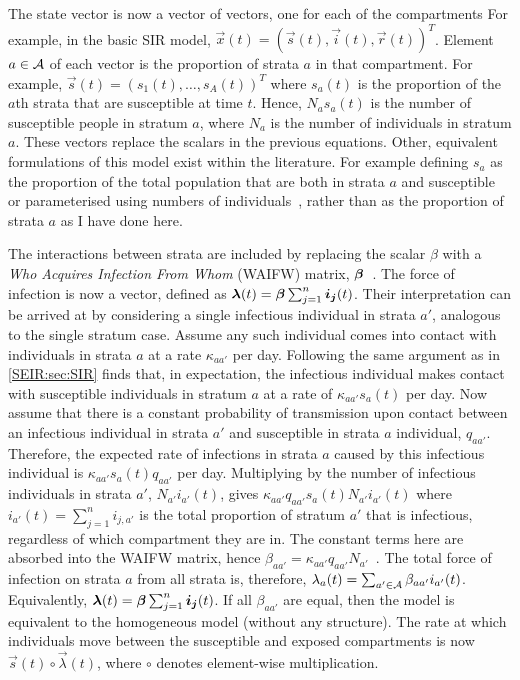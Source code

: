 \documentclass[thesis.tex]{subfiles}
\begin{document}
The state vector is now a vector of vectors, one for each of the compartments
For example, in the basic SIR model, $\vec{x}(t) = (\vec{s}(t), \vec{i}(t), \vec{r}(t))^T$.
Element $a \in \mathcal{A}$ of each vector is the proportion of strata $a$ in that compartment.
For example, $\vec{s}(t) = (s_1(t), \dots, s_A(t))^T$ where $s_a(t)$ is the proportion of the $a$th strata that are susceptible at time $t$.
Hence, $N_a s_a(t)$ is the number of susceptible people in stratum $a$, where $N_a$ is the number of individuals in stratum $a$.
These vectors replace the scalars in the previous equations.
Other, equivalent formulations of this model exist within the literature.
For example defining $s_a$ as the proportion of the total population that are both in strata $a$ and susceptible or parameterised using numbers of individuals~\autocite[57]{keelingModeling}, rather than as the proportion of strata $a$ as I have done here.

The interactions between strata are included by replacing the scalar $\beta$ with a \emph{Who Acquires Infection From Whom} (WAIFW) matrix, $\bm{\beta}$~\autocite[58]{keelingModeling}.
The force of infection is now a vector, defined as $\bm\lambda(t) = \bm{\beta} \sum_{j=1}^n \bm{i_j}(t)$.
Their interpretation can be arrived at by considering a single infectious individual in strata $a'$, analogous to the single stratum case.
Assume any such individual comes into contact with individuals in strata $a$ at a rate $\kappa_{aa'}$ per day.
Following the same argument as in \cref{SEIR:sec:SIR} finds that, in expectation, the infectious individual makes contact with susceptible individuals in stratum $a$ at a rate of $\kappa_{aa'} s_a(t)$ per day.
Now assume that there is a constant probability of transmission upon contact between an infectious individual in strata $a'$ and susceptible in strata $a$ individual, $q_{aa'}$.
Therefore, the expected rate of infections in strata $a$ caused by this infectious individual is $\kappa_{aa'} s_a(t) q_{aa'}$ per day.
Multiplying by the number of infectious individuals in strata $a'$, $N_{a'} i_{a'}(t)$, gives $\kappa_{aa'} q_{aa'} s_a(t) N_{a'} i_{a'}(t)$ where $i_{a'}(t) = \sum_{j=1}^n i_{j,a'}$ is the total proportion of stratum $a'$ that is infectious, regardless of which compartment they are in.
The constant terms here are absorbed into the WAIFW matrix, hence $\beta_{aa'} = \kappa_{aa'} q_{aa'} N_{a'}$~\autocite[section 9.2]{diekmannMathematical}.
The total force of infection on strata $a$ from all strata is, therefore, $\lambda_a(t) = \sum_{a' \in \mathcal{A}} \beta_{aa'} i_{a'}(t)$.
Equivalently, $\bm\lambda(t) = \bm{\beta} \sum_{j=1}^n \bm{i_j}(t)$.
If all $\beta_{aa'}$ are equal, then the model is equivalent to the homogeneous model (\ie without any structure).
The rate at which individuals move between the susceptible and exposed compartments is now $\vec{s}(t) \circ \vec\lambda(t)$, where $\circ$ denotes element-wise multiplication.
\end{document}
